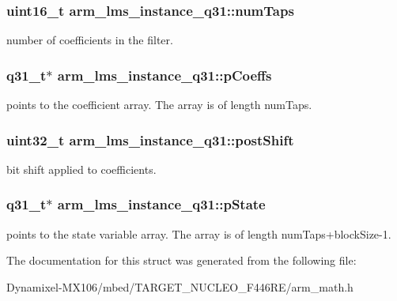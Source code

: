 \subsubsection[{\texorpdfstring{num\+Taps}{numTaps}}]{\setlength{\rightskip}{0pt plus 5cm}uint16\+\_\+t arm\+\_\+lms\+\_\+instance\+\_\+q31\+::num\+Taps}\hypertarget{structarm__lms__instance__q31_ac0d84f7d054555931ef8a62511fbcb8a}{}\label{structarm__lms__instance__q31_ac0d84f7d054555931ef8a62511fbcb8a}
number of coefficients in the filter. 
\subsubsection[{\texorpdfstring{p\+Coeffs}{pCoeffs}}]{\setlength{\rightskip}{0pt plus 5cm}q31\+\_\+t$\ast$ arm\+\_\+lms\+\_\+instance\+\_\+q31\+::p\+Coeffs}\hypertarget{structarm__lms__instance__q31_a4afe56e991a5416adfd462aa88bda500}{}\label{structarm__lms__instance__q31_a4afe56e991a5416adfd462aa88bda500}
points to the coefficient array. The array is of length num\+Taps. 
\subsubsection[{\texorpdfstring{post\+Shift}{postShift}}]{\setlength{\rightskip}{0pt plus 5cm}uint32\+\_\+t arm\+\_\+lms\+\_\+instance\+\_\+q31\+::post\+Shift}\hypertarget{structarm__lms__instance__q31_a4705a8f0011bb9166e09bf5bd51e595e}{}\label{structarm__lms__instance__q31_a4705a8f0011bb9166e09bf5bd51e595e}
bit shift applied to coefficients. 
\subsubsection[{\texorpdfstring{p\+State}{pState}}]{\setlength{\rightskip}{0pt plus 5cm}q31\+\_\+t$\ast$ arm\+\_\+lms\+\_\+instance\+\_\+q31\+::p\+State}\hypertarget{structarm__lms__instance__q31_a206d47b49de6f357f933ebe61520753c}{}\label{structarm__lms__instance__q31_a206d47b49de6f357f933ebe61520753c}
points to the state variable array. The array is of length num\+Taps+block\+Size-\/1. 

The documentation for this struct was generated from the following file\+:\begin{DoxyCompactItemize}
\item 
Dynamixel-\/\+M\+X106/mbed/\+T\+A\+R\+G\+E\+T\+\_\+\+N\+U\+C\+L\+E\+O\+\_\+\+F446\+R\+E/arm\+\_\+math.\+h\end{DoxyCompactItemize}
